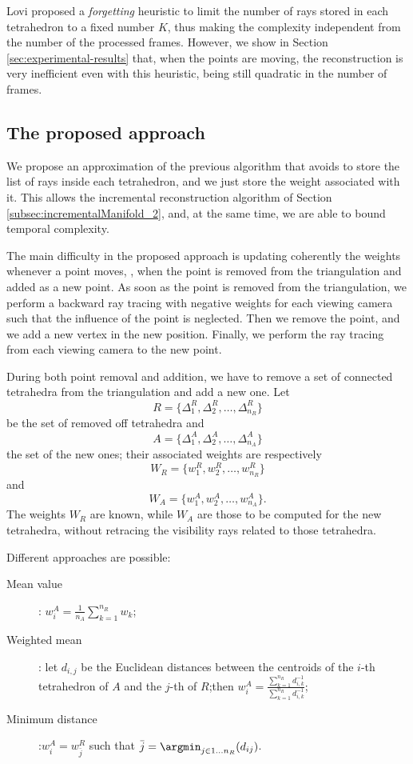 Lovi \etal \cite{lovi_et_al_11} proposed a \emph{forgetting} heuristic to limit the number of rays stored in each tetrahedron to a fixed number $K$, thus making the complexity independent from the number of the processed frames. 
However, we show in Section \ref{sec:experimental-results} that, when the points are moving,  the reconstruction is very inefficient even with this heuristic, being still quadratic in the number of frames.

\subsection{The proposed approach}
\label{subsec:efficient_way}
We propose an approximation of the previous algorithm that avoids to store the list of rays inside each tetrahedron, and we just store the weight associated with it.
This allows the incremental reconstruction algorithm of Section \ref{subsec:incrementalManifold_2}, and, at the same time, we are able to bound temporal complexity.

The main difficulty in the proposed approach is updating coherently the weights whenever a point moves, \ie, when the point is removed from the triangulation and added as a new point. As soon as the point is removed from the triangulation, we perform a backward ray tracing with negative weights for each viewing camera such that the influence of the point is neglected. Then we remove the point, and we add a new vertex in the new position. Finally, we perform the ray tracing from each viewing camera to the new point.

During both point removal and addition, we have to remove a set of connected tetrahedra from the triangulation and add a new one. 
Let 
\[
 R = \{\Delta_1^R, \Delta_2^R, \dots, \Delta_{n_R}^R\}
\]
be the set of removed off tetrahedra and 
\[
A = \{\Delta_1^A, \Delta_2^A, \dots, \Delta_{n_A}^A\}
\]
the set of the new ones; their associated weights are respectively
\[
W_R = \{w_1^R, w_2^R, \dots, w_{n_R}^R\}
\] 
and 
\[
W_A = \{w_1^A, w_2^A, \dots, w_{n_A}^A\}.
\]
The weights $W_R$ are known, while $W_A$ are those to be computed for the new tetrahedra, without retracing the visibility rays related to those tetrahedra.

Different approaches are possible: 
\begin{description}
        \item[Mean value]: $w_i^A = \frac{1}{n_A}\sum_{k=1}^{n_R} w_{k}$;
        \item[Weighted mean]: let $d_{i,j}$ be the Euclidean distances between the centroids of the $i$-th tetrahedron of $A$ and the $j$-th of $R$;then $w_i^A = \frac{\sum_{k=1}^{n_R}d_{i,k}^{-1}}{\sum_{k=1}^{n_R}d_{i,k}^{-1}}$;
        \item[Minimum distance]:$w_i^A = w_{\bar{j}}^R$ such that $\bar{j} = \argmin_{j \in {1\dots n_R}}(d_{ij})$.
\end{description}


